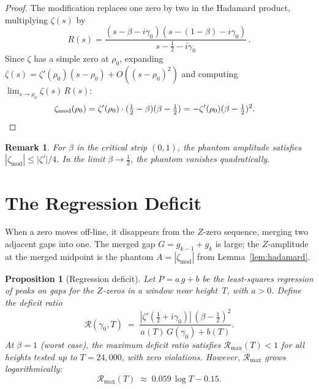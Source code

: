 \documentclass[11pt,a4paper]{article}
\newtheorem{proposition}[theorem]{Proposition}
\newtheorem{remark}[theorem]{Remark}
\begin{document}
\begin{proof}
The modification replaces one zero by two in the Hadamard product, multiplying $\zeta(s)$ by
\[
R(s) = \frac{(s-\beta-i\gamma_0)(s-(1{-}\beta)-i\gamma_0)}{s - \frac{1}{2} - i\gamma_0}\,.
\]
Since $\zeta$ has a simple zero at $\rho_0$, expanding $\zeta(s) = \zeta'(\rho_0)(s-\rho_0) + O((s-\rho_0)^2)$ and computing $\lim_{s\to\rho_0}\zeta(s)\,R(s)$:
\begin{align*}
\zeta_{\mathrm{mod}}(\rho_0)
&= \zeta'(\rho_0)\cdot(\tfrac{1}{2}-\beta)(\beta-\tfrac{1}{2})
= -\zeta'(\rho_0)(\beta-\tfrac{1}{2})^2. \qedhere
\end{align*}
\end{proof}

\begin{remark}
For $\beta$ in the critical strip $(0,1)$, the phantom amplitude satisfies $|\zeta_{\mathrm{mod}}| \leq |\zeta'|\!/4$.
In the limit $\beta \to \frac{1}{2}$, the phantom vanishes quadratically.
\end{remark}


\section{The Regression Deficit}\label{sec:deficit}

When a zero moves off-line, it disappears from the $Z$-zero sequence, merging two adjacent gaps into one.
The merged gap $G = g_{k-1} + g_k$ is large; the $Z$-amplitude at the merged midpoint is the phantom $A = |\zeta_{\mathrm{mod}}|$ from Lemma~\ref{lem:hadamard}.

\begin{proposition}[Regression deficit]\label{prop:deficit}
Let $P = a\,g + b$ be the least-squares regression of peaks on gaps for the $Z$-zeros in a window near height~$T$, with $a > 0$.
Define the \emph{deficit ratio}
\[
\mathcal{R}(\gamma_0, T) \;=\; \frac{|\zeta'(\frac{1}{2}+i\gamma_0)|\,(\beta-\frac{1}{2})^2}{a(T)\,G(\gamma_0) + b(T)}.
\]
At $\beta = 1$ (worst case), the maximum deficit ratio satisfies $\mathcal{R}_{\max}(T) < 1$ for all heights tested up to $T = 24{,}000$, with zero violations.
However, $\mathcal{R}_{\max}$ grows logarithmically:
\[
\mathcal{R}_{\max}(T) \;\approx\; 0.059\,\log T - 0.15.
\]
\end{proposition}
\end{document}
